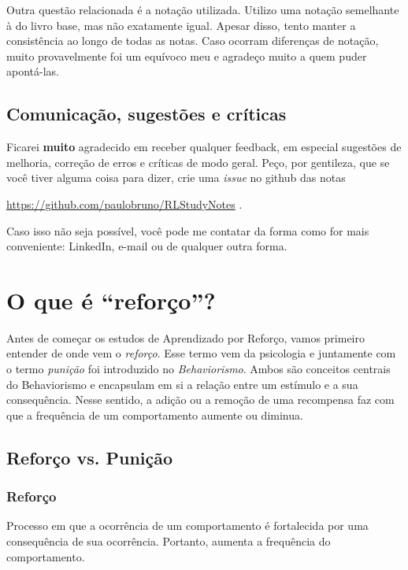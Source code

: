 \documentclass{article}
\begin{document}
            Outra questão relacionada é a notação utilizada. Utilizo uma notação semelhante à do livro base, mas não exatamente igual. Apesar disso, tento manter a consistência ao longo de todas as notas. Caso ocorram diferenças de notação, muito provavelmente foi um equívoco meu e agradeço muito a quem puder apontá-las.
            
        \subsection{Comunicação, sugestões e críticas}
            
            Ficarei \textbf{muito} agradecido em receber qualquer feedback, em especial sugestões de melhoria, correção de erros e críticas de modo geral. Peço, por gentileza, que se você tiver alguma coisa para dizer, crie uma \emph{issue} no github das notas
            \begin{center}
                \url{https://github.com/paulobruno/RLStudyNotes} .
            \end{center}
            Caso isso não seja possível, você pode me contatar da forma como for mais conveniente: LinkedIn, e-mail ou de qualquer outra forma.
            
    \section{O que é ``reforço''?}
    
        Antes de começar os estudos de Aprendizado por Reforço, vamos primeiro entender de onde vem o \emph{reforço}. Esse termo vem da psicologia e juntamente com o termo \emph{punição} foi introduzido no \emph{Behaviorismo}. Ambos são conceitos centrais do Behaviorismo e encapsulam em si a relação entre um estímulo e a sua consequência. Nesse sentido, a adição ou a remoção de uma recompensa faz com que a frequência de um comportamento aumente ou diminua.
    
        \subsection{Reforço vs. Punição}
        
            \subsubsection{Reforço}
            
                Processo em que a ocorrência de um comportamento é fortalecida por uma consequência de sua ocorrência. Portanto, aumenta a frequência do comportamento.
            
\end{document}
